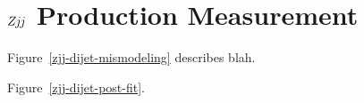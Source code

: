 \documentclass{PoS}
\def\zjj{\ensuremath{Z\kern -0.1em j\kern -0.1emj}\xspace}
\begin{document}



\section{\zjj Production Measurement}

Figure~\ref{zjj-dijet-mismodeling} describes blah.


Figure~\ref{zjj-dijet-post-fit}.
\end{document}
